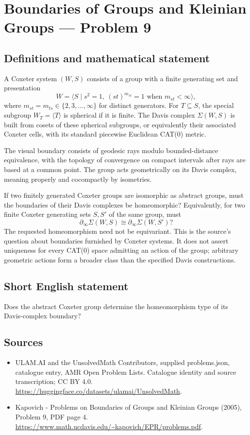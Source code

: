 \documentclass[11pt,a4paper]{article}
\begin{document}
\section*{Boundaries of Groups and Kleinian Groups — Problem 9}\label{statement}

\subsection{Definitions and mathematical statement}
A Coxeter system $(W,S)$ consists of a group with a finite generating set and presentation
\[
 W=\langle S\mid s^2=1,\ (st)^{m_{st}}=1
                 \text{ when }m_{st}<\infty\rangle,
\]
where $m_{st}=m_{ts}\in\{2,3,\ldots,\infty\}$ for distinct generators. For $T\subseteq S$, the special subgroup $W_T=\langle T\rangle$ is spherical if it is finite. The Davis complex $\Sigma(W,S)$ is built from cosets of these spherical subgroups, or equivalently their associated Coxeter cells, with its standard piecewise Euclidean CAT(0) metric.

The visual boundary consists of geodesic rays modulo bounded-distance equivalence, with the topology of convergence on compact intervals after rays are based at a common point. The group acts geometrically on its Davis complex, meaning properly and cocompactly by isometries.

If two finitely generated Coxeter groups are isomorphic as abstract groups, must the boundaries of their Davis complexes be homeomorphic? Equivalently, for two finite Coxeter generating sets $S,S'$ of the same group, must
\[
 \partial_\infty\Sigma(W,S)\cong\partial_\infty\Sigma(W,S')?
\]
The requested homeomorphism need not be equivariant. This is the source's question about boundaries furnished by Coxeter systems. It does not assert uniqueness for every CAT(0) space admitting an action of the group; arbitrary geometric actions form a broader class than the specified Davis constructions.
\subsection{Short English statement}
Does the abstract Coxeter group determine the homeomorphism type of its Davis-complex boundary?
\subsection{Sources}
\begin{itemize}
\item[S1] ULAM.AI and the UnsolvedMath Contributors, supplied problems.json, catalogue entry, AMR Open Problem Lists. Catalogue identity and source transcription; CC BY 4.0.
\url{https://huggingface.co/datasets/ulamai/UnsolvedMath}.
\item[S2] Kapovich - Problems on Boundaries of Groups and Kleinian Groups (2005), Problem 9, PDF page 4. 
\url{https://www.math.ucdavis.edu/~kapovich/EPR/problems.pdf}.
\end{itemize}
\end{document}

